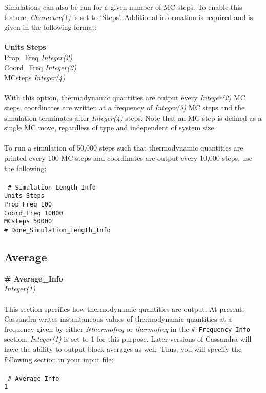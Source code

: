 %
Simulations can also be run for a given number of MC steps. To enable this feature, 
{\it Character(1)} is set to `Steps'. Additional information is required and is given in the
following format: \\ \\
%
{\bf Units    Steps} \\
Prop\_Freq       {\it Integer(2) }\\
Coord\_Freq         {\it Integer(3)} \\
MCsteps                  {\it Integer(4)} \\ \\
%
With this option, thermodynamic quantities are output every {\it Integer(2)} MC steps,
coordinates are written at a frequency of {\it Integer(3)} MC steps and the simulation
terminates after {\it Integer(4)} steps. Note that an MC step is defined as a single MC move, regardless of type and independent of system size.\\ \\
%
To run a simulation of 50,000 steps such that thermodynamic quantities are printed
every 100 MC steps and coordinates are output every 10,000 steps, use the following: \\ \\
%
\texttt{
\# Simulation\_Length\_Info \\
Units           Steps \\
Prop\_Freq      100 \\
Coord\_Freq     10000 \\
MCsteps         50000 \\
\# Done\_Simulation\_Length\_Info}
%
%
%
%
\subsection{Average}\label{sec:Average_Info}
{\bf \# Average\_Info} \\
{\it Integer(1)} \\ \\
%
This section specifies how thermodynamic quantities are output. At present, Cassandra
writes instantaneous values of thermodynamic quantities at a frequency given by
either {\it Nthermofreq} or {\it thermofreq} in the \texttt{\# Frequency\_Info} section. {\it Integer(1)}
is set to 1 for this purpose. Later versions of Cassandra will have the ability to output block
averages as well. Thus, you will specify the following section in your input file: \\ \\
%
\texttt{
\# Average\_Info \\ 
1}
%
%
